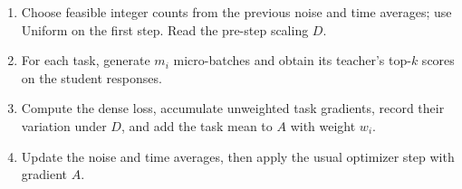 \begin{algorithm}[t]
\caption{One training step with GPAS.}
\label{alg:batch_gpas}
\small
\begin{minipage}{0.97\linewidth}
\begin{enumerate}
    \item Choose feasible integer counts from the previous noise and time
    averages; use Uniform on the first step. Read the pre-step scaling $D$.
    \item For each task, generate $m_i$ micro-batches and obtain its
    teacher's top-$k$ scores on the student responses.
    \item Compute the dense loss, accumulate unweighted task gradients,
    record their variation under $D$, and add the task mean to $A$ with
    weight $w_i$.
    \item Update the noise and time averages, then apply the usual
    optimizer step with gradient $A$.
\end{enumerate}
\end{minipage}
\end{algorithm}
